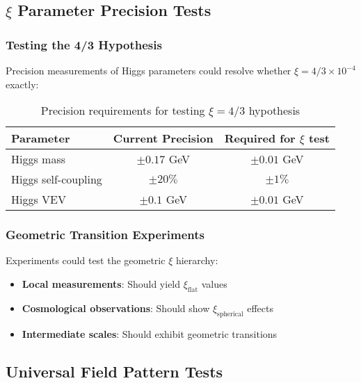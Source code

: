 \documentclass[12pt,a4paper]{article}
\newcommand{\xipar}{\ensuremath{\xi}}
\newcommand{\mytimes}{\ensuremath{\times}}
\begin{document}
	\subsection{$\xi$ Parameter Precision Tests}
	\label{subsec:xi_precision_tests}
	
	\subsubsection{Testing the 4/3 Hypothesis}
	\label{subsubsec:testing_four_thirds}
	
	Precision measurements of Higgs parameters could resolve whether $\xipar = 4/3 \mytimes 10^{-4}$ exactly:
	
	\begin{table}[htbp]
		\centering
		\begin{tabular}{lcc}
			\toprule
			\textbf{Parameter} & \textbf{Current Precision} & \textbf{Required for $\xi$ test} \\
			\midrule
			Higgs mass & $\pm 0.17$ GeV & $\pm 0.01$ GeV \\
			Higgs self-coupling & $\pm 20\%$ & $\pm 1\%$ \\
			Higgs VEV & $\pm 0.1$ GeV & $\pm 0.01$ GeV \\
			\bottomrule
		\end{tabular}
		\caption{Precision requirements for testing $\xi = 4/3$ hypothesis}
		\label{tab:precision_requirements}
	\end{table}
	
	\subsubsection{Geometric Transition Experiments}
	\label{subsubsec:geometric_transitions}
	
	Experiments could test the geometric $\xi$ hierarchy:
	\begin{itemize}
		\item \textbf{Local measurements}: Should yield $\xipar_{\text{flat}}$ values
		\item \textbf{Cosmological observations}: Should show $\xipar_{\text{spherical}}$ effects
		\item \textbf{Intermediate scales}: Should exhibit geometric transitions
	\end{itemize}
	
	\subsection{Universal Field Pattern Tests}
	\label{subsec:field_pattern_tests}
	
\end{document}
